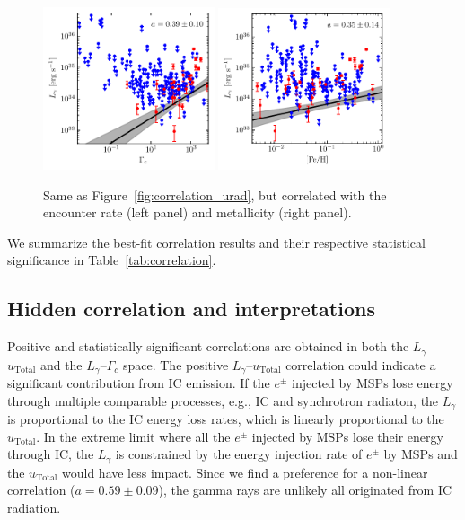 \documentclass[doublespace,nopageskip]{VTthesis}
\begin{document}
\begin{figure}[htb]
    \centering
    \includegraphics[width=0.45\textwidth]{Figures/Globular/correlation/L_gamma_vs_encounter_rate.pdf}
    \includegraphics[width=0.45\textwidth]{Figures/Globular/correlation/L_gamma_vs_metallicity.pdf}
    \caption{\label{fig:correlation_other} Same as Figure~\ref{fig:correlation_urad}, but correlated with the encounter rate (left panel) and metallicity (right panel).}
\end{figure}

We summarize the best-fit correlation results and their respective statistical significance in Table~\ref{tab:correlation}.

\subsection{Hidden correlation and interpretations}\label{sec:hidden}

Positive and statistically significant correlations are obtained in both the $L_\gamma$--$u_\mathrm{Total}$ and the $L_\gamma$--$\Gamma_c$ space. The positive $L_\gamma$--$u_\mathrm{Total}$ correlation could indicate a  significant contribution from IC emission. If the $e^\pm$ injected by MSPs lose energy through multiple comparable processes, e.g., IC and synchrotron radiaton, the $L_\gamma$ is proportional to the IC energy loss rates, which is linearly proportional to the $u_\mathrm{Total}$. In the extreme limit where all the $e^\pm$ injected by MSPs lose their energy through IC, the $L_\gamma$ is constrained by the energy injection rate of $e^\pm$ by MSPs and the $u_\mathrm{Total}$ would have less impact. Since we find a preference for a non-linear correlation ($a= 0.59 \pm 0.09$), the gamma rays are unlikely all originated from IC radiation.
\end{document}
